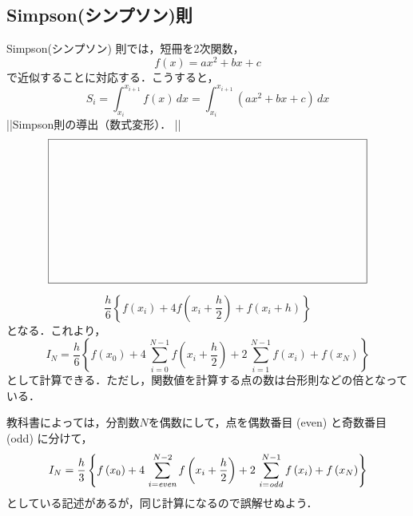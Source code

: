 \subsection{Simpson(シンプソン)則}
Simpson(シンプソン) 則では，短冊を2次関数，
\begin{equation*}
f(x) = ax^2+bx+c
\end{equation*}
で近似することに対応する．こうすると，
\begin{equation*}
S_i=\int _{x_i}^{x_{i+1}}f ( x )\, {dx}=\int _{x_i}^{x_{i+1}}(ax^2+bx+c)\,{dx}
\end{equation*}
\ifHIKI %
||Simpson則の導出（数式変形）．
||
\else %
\begin{equation*}
\setlength{\unitlength}{1cm}
\begin{picture}(10,4.5)
\put(0,0){\framebox(10,4.5){}}
\end{picture}
\end{equation*}
\fi %

\begin{equation*}
\frac{h}{6} \left\{f(x_i)+4f\left(x_i+\frac{h}{2}\right)+f(x_i+h)\right\}
\end{equation*}
となる．これより，
\begin{equation*}
I_N=\frac{h}{6} \left\{ f \left( x_0 \right) +4\,\sum _{i=0}^{N-1}f \left( x_i+\frac{h}{2} \right) +2\,\sum_{i=1}^{N-1}f \left( x_i \right) +f \left( x_N \right)  \right\}
\end{equation*}
として計算できる．ただし，関数値を計算する点の数は台形則などの倍となっている．

教科書によっては，分割数$N$を偶数にして，点を偶数番目 (even) と奇数番目 (odd) に分けて，
\begin{equation*}
I_{{N}}=\frac{h}{3} \left\{ f \left( x_{{0}} \right) +4\,\sum _{i={\it even}}^{N-2}f \left( x_{{i}}+\frac{h}{2} \right) +2\,\sum _{i={\it odd}}^{N-1}f \left( x_{{i}} \right) +f \left( x_{{N}} \right) \right\}
\end{equation*}
としている記述があるが，同じ計算になるので誤解せぬよう．
